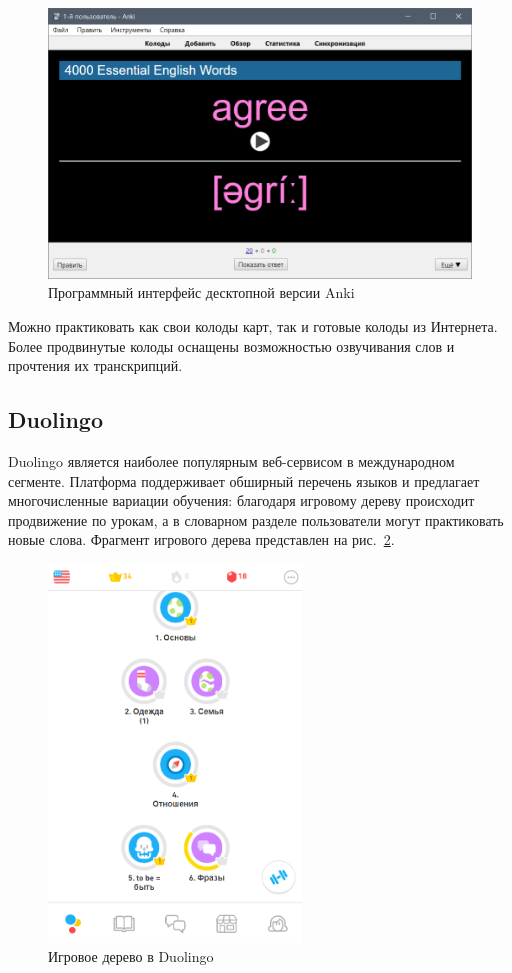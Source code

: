 \begin{figure}[h]
	\centering
	\includegraphics[keepaspectratio, scale=0.7]{figures/anki}
	\caption{Программный интерфейс десктопной версии Anki}
	\label{fig:anki}
\end{figure}

Можно практиковать как свои колоды карт, так и готовые колоды из Интернета. Более продвинутые колоды оснащены возможностью озвучивания слов и прочтения их транскрипций.

\subsection{Duolingo}

Duolingo является наиболее популярным веб-сервисом в международном сегменте. Платформа поддерживает обширный перечень языков и предлагает многочисленные вариации обучения: благодаря игровому дереву происходит продвижение по урокам, а в словарном разделе пользователи могут практиковать новые слова. Фрагмент игрового дерева представлен на рис.~\ref{fig:duo}.

\begin{figure}[h]
	\centering
	\includegraphics[width=0.6\textwidth, keepaspectratio]{figures/duo}
	\caption{Игровое дерево в Duolingo}
	\label{fig:duo}
\end{figure}

